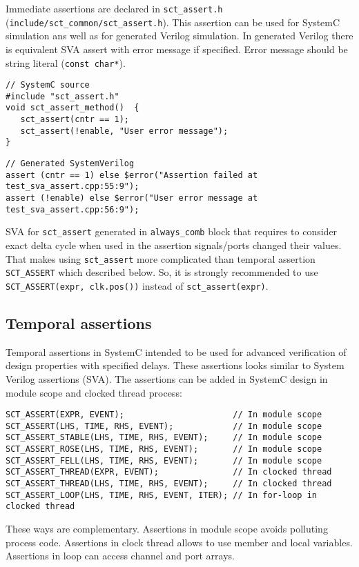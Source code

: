 Immediate assertions are declared in {\tt sct\_assert.h} ({\tt include/sct\_common/sct\_assert.h}). This assertion can be used for SystemC simulation ans well as for generated Verilog simulation. In generated Verilog there is equivalent SVA assert with error message if specified. Error message should be string literal ({\tt const char*}).

\begin{lstlisting}[style=mycpp]
// SystemC source
#include "sct_assert.h"
void sct_assert_method()  {
   sct_assert(cntr == 1);
   sct_assert(!enable, "User error message");
}
\end{lstlisting}
%
\begin{lstlisting}[style=myverilog]
// Generated SystemVerilog
assert (cntr == 1) else $error("Assertion failed at test_sva_assert.cpp:55:9");
assert (!enable) else $error("User error message at test_sva_assert.cpp:56:9");
\end{lstlisting}

SVA for {\tt sct\_assert} generated in {\tt always\_comb} block that requires to consider exact delta cycle when used in the assertion signals/ports changed their values. That makes using {\tt sct\_assert} more complicated than temporal assertion {\tt SCT\_ASSERT} which described below. So, it is strongly recommended to use {\tt SCT\_ASSERT(expr, clk.pos())} instead of {\tt sct\_assert(expr)}.

\subsection{Temporal assertions}

Temporal assertions in SystemC intended to be used for advanced verification of design properties with specified delays. These assertions looks similar to System Verilog assertions (SVA). The assertions can be added in SystemC design in module scope and clocked thread process:

\begin{lstlisting}[style=mycpp]
SCT_ASSERT(EXPR, EVENT);                      // In module scope 
SCT_ASSERT(LHS, TIME, RHS, EVENT);            // In module scope 
SCT_ASSERT_STABLE(LHS, TIME, RHS, EVENT);     // In module scope 
SCT_ASSERT_ROSE(LHS, TIME, RHS, EVENT);       // In module scope 
SCT_ASSERT_FELL(LHS, TIME, RHS, EVENT);       // In module scope 
SCT_ASSERT_THREAD(EXPR, EVENT);               // In clocked thread 
SCT_ASSERT_THREAD(LHS, TIME, RHS, EVENT);     // In clocked thread 
SCT_ASSERT_LOOP(LHS, TIME, RHS, EVENT, ITER); // In for-loop in clocked thread
\end{lstlisting}
%
These ways are complementary. Assertions in module scope avoids polluting process code. Assertions in clock thread allows to use member and local variables. Assertions in loop can access channel and port arrays.

